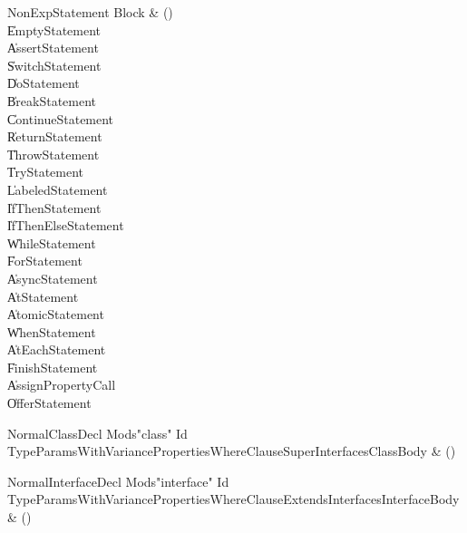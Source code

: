 \begin{bbgrammar}

NonExpStatement \label{prod:NonExpStatement}  \: Block & () \\

    \| EmptyStatement \\
    \| AssertStatement \\
    \| SwitchStatement \\
    \| DoStatement \\
    \| BreakStatement \\
    \| ContinueStatement \\
    \| ReturnStatement \\
    \| ThrowStatement \\
    \| TryStatement \\
    \| LabeledStatement \\
    \| IfThenStatement \\
    \| IfThenElseStatement \\
    \| WhileStatement \\
    \| ForStatement \\
    \| AsyncStatement \\
    \| AtStatement \\
    \| AtomicStatement \\
    \| WhenStatement \\
    \| AtEachStatement \\
    \| FinishStatement \\
    \| AssignPropertyCall \\
    \| OfferStatement \\

\end{bbgrammar}

\begin{bbgrammar}

NormalClassDecl \label{prod:NormalClassDecl}  \: Mods\opt \xcd"class" Id TypeParamsWithVariance\opt Properties\opt WhereClause\opt Super\opt Interfaces\opt ClassBody & () \\


\end{bbgrammar}

\begin{bbgrammar}

NormalInterfaceDecl \label{prod:NormalInterfaceDecl}  \: Mods\opt \xcd"interface" Id TypeParamsWithVariance\opt Properties\opt WhereClause\opt ExtendsInterfaces\opt InterfaceBody & () \\


\end{bbgrammar}

